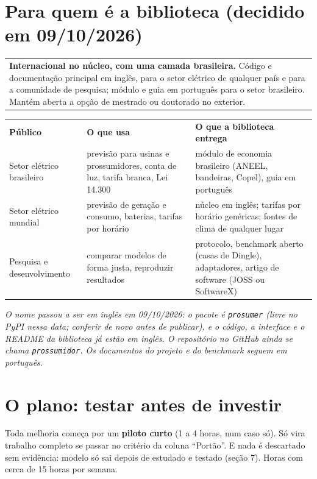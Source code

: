 \documentclass[10pt,a4paper]{article}
\newcommand{\cab}[1]{\cellcolor{acento}\color{white}\bfseries #1}
\newcommand{\nota}[1]{{\small\itshape\color{cinza}#1\par}}
\newcommand{\caixa}[1]{%
  \noindent\begin{tabular}{!{\color{acento}\vrule width 3pt}>{\columncolor{claro}}p{\dimexpr\linewidth-3pt-2\tabcolsep}}
  \rule{0pt}{14pt}#1\vspace{6pt}\\
  \end{tabular}\par\vspace{4pt}}
\begin{document}
\needspace{8cm}
\section{Para quem é a biblioteca (decidido em 09/10/2026)}
\caixa{\textbf{Internacional no núcleo, com uma camada brasileira.} Código e documentação principal em
inglês, para o setor elétrico de qualquer país e para a comunidade de pesquisa; módulo e guia em
português para o setor brasileiro. Mantém aberta a opção de mestrado ou doutorado no exterior.}

\begin{tabularx}{\linewidth}{@{}>{\raggedright\arraybackslash}p{3.4cm}YY@{}}
\cab{Público} & \cab{O que usa} & \cab{O que a biblioteca entrega} \\
Setor elétrico brasileiro & previsão para usinas e prossumidores, conta de luz, tarifa branca,
  Lei 14.300 & módulo de economia brasileiro (ANEEL, bandeiras, Copel), guia em português \\
Setor elétrico mundial & previsão de geração e consumo, baterias, tarifas por horário &
  núcleo em inglês; tarifas por horário genéricas; fontes de clima de qualquer lugar \\
Pesquisa e desenvolvimento & comparar modelos de forma justa, reproduzir resultados & protocolo,
  benchmark aberto (casas de Dingle), adaptadores, artigo de software (JOSS ou SoftwareX) \\
\end{tabularx}

\nota{O nome passou a ser em inglês em 09/10/2026: o pacote é \texttt{prosumer} (livre no PyPI nessa data;
conferir de novo antes de publicar), e o código, a interface e o README da biblioteca já estão em inglês.
O repositório no GitHub ainda se chama \texttt{prossumidor}. Os documentos do projeto e do benchmark
seguem em português.}

\needspace{8cm}
\section{O plano: testar antes de investir}
Toda melhoria começa por um \textbf{piloto curto} (1 a 4 horas, num caso só). Só vira trabalho completo
se passar no critério da coluna ``Portão''. E nada é descartado sem evidência: modelo só sai depois de
estudado e testado (seção 7). Horas com cerca de 15 horas por semana.
\end{document}
